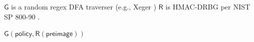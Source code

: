 \begin{algorithm}[H]
\caption{MFDPG Password Generation Algorithm}
\label{alg:generation}
\begin{algorithmic}[1]
\Require $\mathsf{G}$ is a random regex DFA traverser (e.g., Xeger \cite{team2009xeger})
\Require $\mathsf{R}$ is HMAC-DRBG per NIST SP 800-90 \cite{barker_recommendation_2015}.

    \State \Return $\mathsf{G}(\mathsf{policy}, \mathsf{R}(\mathsf{preimage}))$
\EndFunction

\end{algorithmic}
\end{algorithm}

